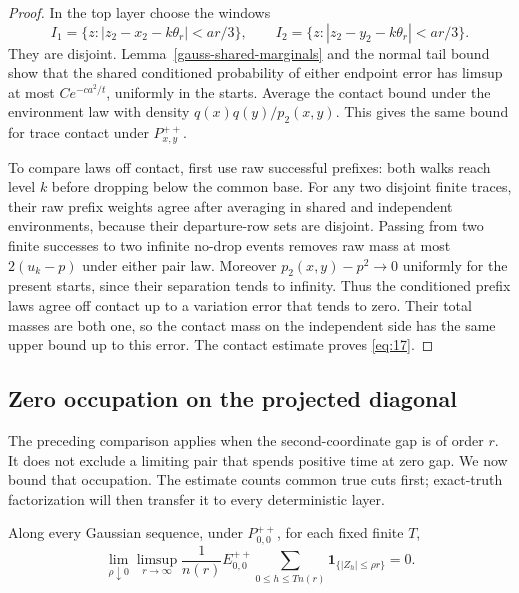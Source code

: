 \begin{proof}
In the top layer choose the windows
\[
I_1=\{z:|z_2-x_2-k\theta_r|<ar/3\},\qquad
I_2=\{z:|z_2-y_2-k\theta_r|<ar/3\}.
\]
They are disjoint. Lemma~\ref{gauss-shared-marginals} and the normal
tail bound show that the shared conditioned probability of either
endpoint error has limsup at most \(Ce^{-ca^2/t}\), uniformly in the
starts. Average the contact bound under the environment
law with density \(q(x)q(y)/p_2(x,y)\). This gives the same bound for
trace contact under \(P_{x,y}^{++}\).

To compare laws off contact, first use raw successful prefixes: both
walks reach level \(k\) before dropping below the common base. For any
two disjoint finite traces, their raw prefix weights agree after
averaging in shared and independent environments, because their
departure-row sets are disjoint. Passing from two finite successes to
two infinite no-drop events removes raw mass at most \(2(u_k-p)\)
under either pair law. Moreover \(p_2(x,y)-p^2\to0\) uniformly for the
present starts, since their separation tends to infinity. Thus the
conditioned prefix laws agree off contact up to a variation error that
tends to zero. Their total masses are both one, so the contact mass on
the independent side has the same upper bound up to this error. The
contact estimate proves \eqref{eq:17}.
\end{proof}

\subsection{Zero occupation on the projected diagonal}

The preceding comparison applies when the second-coordinate gap is of
order \(r\). It does not exclude a limiting pair that spends positive
time at zero gap. We now bound that occupation. The estimate counts
common true cuts first; exact-truth factorization will then transfer
it to every deterministic layer.

\begin{proposition}\label{gauss-diagonal}
Along every Gaussian sequence, under \(P_{0,0}^{++}\), for each fixed
finite \(T\),
\[
\lim_{\rho\downarrow0}\limsup_{r\to\infty}
\frac1{n(r)}E_{0,0}^{++}
 \sum_{0\le h\le Tn(r)}\mathbf1_{\{|Z_h|\le\rho r\}}=0.
\tag{18}\label{eq:18}
\]
\end{proposition}

